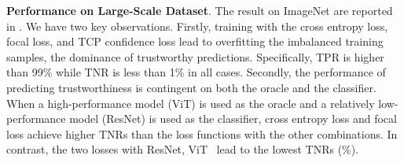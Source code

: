 
% 


\noindent\textbf{Performance on Large-Scale Dataset}. 
The result on ImageNet are reported in . We have two key observations. Firstly, training with the cross entropy loss, focal loss, and TCP confidence loss lead to overfitting the imbalanced training samples, \ie the dominance of trustworthy predictions. Specifically, TPR is higher than 99\% while TNR is less than 1\% in all cases. Secondly, the performance of predicting trustworthiness is contingent on both the oracle and the classifier. When a high-performance model (\ie ViT) is used as the oracle and a relatively low-performance model (\ie ResNet) is used as the classifier, cross entropy loss and focal loss achieve higher TNRs than the loss functions with the other combinations. In contrast, the two losses with \textlangle ResNet, ViT\textrangle~ lead to the lowest TNRs (\%). %

